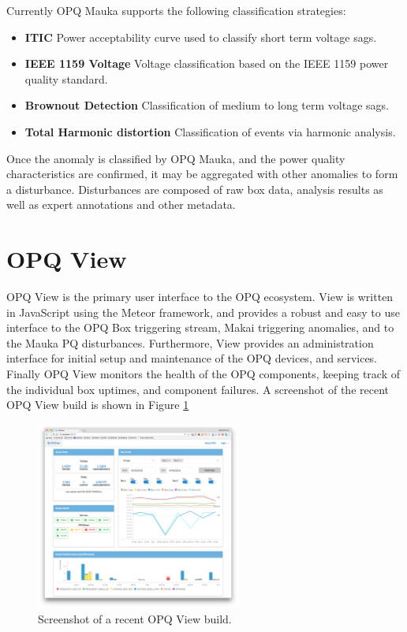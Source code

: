 Currently OPQ Mauka supports the following classification strategies: 
\begin{itemize}
	\item{\textbf{ITIC}} Power acceptability curve used to classify short term voltage sags.
	\item{\textbf{IEEE 1159 Voltage}} Voltage classification based on the IEEE 1159 power quality standard.
	\item{\textbf{Brownout Detection}} Classification of medium to long term voltage sags.
	\item{\textbf{Total Harmonic distortion}} Classification of events via harmonic analysis.
\end{itemize}

Once the anomaly is classified by OPQ Mauka, and the power quality characteristics are confirmed, it may be aggregated with other anomalies to form a disturbance. Disturbances are composed of raw box data, analysis results as well as expert annotations and other metadata.

\section{OPQ View}

OPQ View is the primary user interface to the OPQ ecosystem. View is written in JavaScript using the Meteor framework, and provides a robust and easy to use interface to the OPQ Box triggering stream, Makai triggering anomalies, and to the Mauka PQ disturbances. Furthermore, View provides an administration interface for initial setup and maintenance of the OPQ devices, and services. Finally OPQ View monitors the health of the OPQ components, keeping track of the individual box uptimes, and component failures. A screenshot of the recent OPQ View build is shown in Figure \ref{fig:9}

\begin{figure}[h]
  \begin{center}
  \includegraphics[width=0.6\textwidth]{img/opqview-landing-page.png}
  \end{center}
  \caption{Screenshot of a recent OPQ View build.}
  \label{fig:9}
\end{figure}
